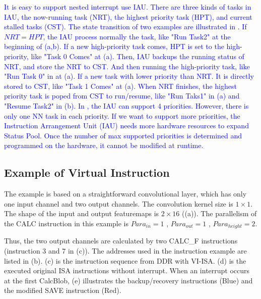 \textcolor{blue}{
It is easy to support nested interrupt use IAU.
There are three kinds of tasks in IAU, the now-running task (NRT), the highest priority task (HPT), and current stalled tasks (CST).
The state transition of two examples are illustrated in .
If $NRT=HPT$, the IAU process normally the task, like "Run Task2" at the beginning of (a,b).
If a new high-priority task comes, HPT is set to the high-priority, like "Task 0 Comes" at (a). Then, IAU backups the running status of NRT, and store the NRT to CST. And then running the high-priority task, like "Run Task 0" in at (a).
If a new task with lower priority than NRT. It is directly stored to CST, like "Task 1 Comes" at (a).
When NRT finishes, the highest priority task is poped from CST to run/resume, like "Run Taks1" in (a) and "Resume Task2" in (b).
In , the IAU can support 4 priorities. 
However, there is only one NN task in each priority. 
If we want to support more priorities, the Instruction Arrangement Unit (IAU) needs more hardware resources to expand Status Pool.
Once the number of max supported priorities is determined and programmed on the hardware, it cannot be modified at runtime.
}


\subsection{Example of Virtual Instruction}
\label{sec:exampleVirtual}


The example is based on a straightforward convolutional layer, which has only one input channel and two output channels. 
The convolution kernel size is $1 \times 1$. The shape of the input and output featuremaps is $ 2 \times 16 $ ((a)). The parallelism of the CALC instruction in this example is $ Para_{in} = 1$ , $ Para_{out}=1$ , $Para_{height}=2$.

Thus, the two output channels are calculated by two CALC\_F instructions (instruction 3 and 7 in (c)). The addresses used in the instruction example are listed in (b). (c) is the instruction sequence from DDR with VI-ISA. (d) is the executed original ISA instructions without interrupt. When an interrupt occurs at the first CalcBlob, (e) illustrates the backup/recovery instructions (Blue) and the modified SAVE instruction (Red). 

